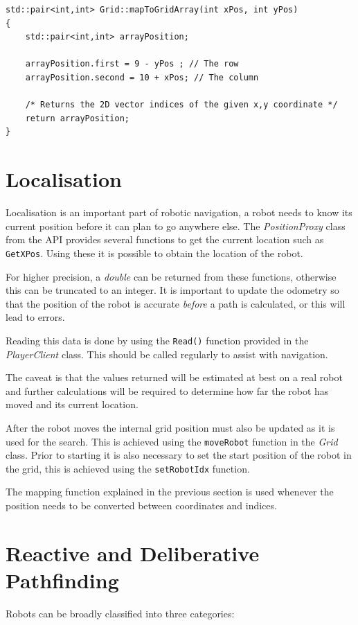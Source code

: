 \documentclass[a4paper,12pt]{article}
\begin{document}
\begin{lstlisting}
std::pair<int,int> Grid::mapToGridArray(int xPos, int yPos)
{
    std::pair<int,int> arrayPosition;

    arrayPosition.first = 9 - yPos ; // The row
    arrayPosition.second = 10 + xPos; // The column

    /* Returns the 2D vector indices of the given x,y coordinate */
    return arrayPosition; 
}
\end{lstlisting}
\section{Localisation}
Localisation is an important part of robotic navigation, a robot needs to know its current position before it can plan to go anywhere else. The \textit{PositionProxy} class from the API provides several functions to get the current location such as \texttt{GetXPos}. Using these it is possible to obtain the location of the robot.

For higher precision, a \textit{double} can be returned from these functions, otherwise this can be truncated to an integer. It is important to update the odometry so that the position of the robot is accurate \textit{before} a path is calculated, or this will lead to errors. 

Reading this data is done by using the \texttt{Read()} function provided in the \textit{PlayerClient} class. This should be called regularly to assist with navigation.

The caveat is that the values returned will be estimated at best on a real robot and further calculations will be required to determine how far the robot has moved and its current location.

After the robot moves the internal grid position must also be updated as it is used for the search. This is achieved using the \texttt{moveRobot} function in the \textit{Grid} class. Prior to starting it is also necessary to set the start position of the robot in the grid, this is achieved using the \texttt{setRobotIdx} function. 

The mapping function explained in the previous section is used whenever the position needs to be converted between coordinates and indices.
\section{Reactive and Deliberative Pathfinding}
Robots can be broadly classified into three categories:
\end{document}
